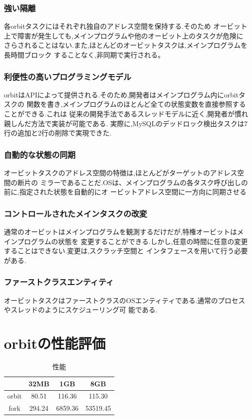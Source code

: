 \documentclass[submit,techreq,noauthor]{eco}	%
\begin{document}
\subsubsection*{強い隔離}
各orbitタスクにはそれぞれ独自のアドレス空間を保持する.そのため
オービット上で障害が発生しても,メインプログラムや他のオービット上のタスクが危険に
さらされることはない.また,ほとんどのオービットタスクは,メインプログラムを長時間ブロック
することなく,非同期で実行される。

\subsubsection*{利便性の高いプログラミングモデル}
orbitはAPIによって提供される.そのため,開発者はメインプログラム内にorbitタスクの
関数を書き,メインプログラムのほとんど全ての状態変数を直接参照することができる.これは
従来の開発手法であるスレッドモデルに近く,開発者が慣れ親しんだ方法で実装が可能である.
実際に,MySQLのデッドロック検出タスクは7行の追加と2行の削除で実現できた.

\subsubsection*{自動的な状態の同期}
オービットタスクのアドレス空間の特徴は,ほとんどがターゲットのアドレス空間の断片の
ミラーであることだ.OSは、メインプログラムの各タスク呼び出しの前に,指定された状態を自動的にオ
ービットアドレス空間に一方向に同期させる

\subsubsection*{コントロールされたメインタスクの改変}
通常のオービットはメインプログラムを観測するだけだが,特権オービットはメインプログラムの状態を
変更することができる.しかし,任意の時間に任意の変更することはできない.変更は,スクラッチ空間と
インタフェースを用いて行う必要がある.

\subsubsection*{ファーストクラスエンティティ}
オービットタスクはファーストクラスのOSエンティティである.通常のプロセスやスレッドのようにスケジューリング可
能である.

\section{orbitの性能評価}

\begin{table}[H]
  \centering
  \caption{性能}
  \begin{tabular}{cccc}
  \hline
        & 32MB   & 1GB     & 8GB      \\ \hline
  orbit & 80.51  & 116.36  & 115.30   \\
  fork  & 294.24 & 6859.36 & 53519.45 \\ \hline
  \end{tabular}
  \end{table}
\end{document}
